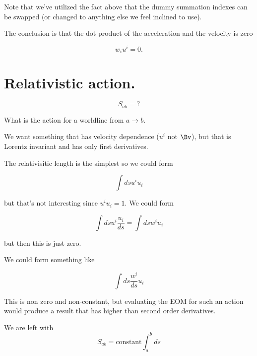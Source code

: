 Note that we've utilized the fact above that the dummy summation indexes can be swapped (or changed to anything else we feel inclined to use).

The conclusion is that the dot product of the acceleration and the velocity is zero

\begin{equation}\label{eqn:relativisticElectrodynamicsL7:130}
w_i u^i = 0.
\end{equation}

\section{Relativistic action.}

\begin{equation}\label{eqn:relativisticElectrodynamicsL7:140}
S_{ab} = ?
\end{equation}

What is the action for a worldline from $a \rightarrow b$.

We want something that has velocity dependence ($u^i$ not $\Bv$), but that is Lorentz invariant and has only first derivatives.

The relativisitic length is the simplest so we could form

\begin{equation}\label{eqn:relativisticElectrodynamicsL7:150}
\int ds u^i u_i
\end{equation}

but that's not interesting since $u^i u_i = 1$.  We could form

\begin{equation}\label{eqn:relativisticElectrodynamicsL7:160}
\int ds u^i \frac{u_i}{ds} = \int ds w^i u_i
\end{equation}

but then this is just zero.

We could form something like

\begin{equation}\label{eqn:relativisticElectrodynamicsL7:170}
\int ds \frac{w^i}{ds} u_i
\end{equation}

This is non zero and non-constant, but evaluating the EOM for such an action would produce a result that has higher than second order derivatives.

We are left with
\begin{equation}\label{eqn:relativisticElectrodynamicsL7:180}
S_{ab} = \text{constant} \int_a^b ds 
\end{equation}

